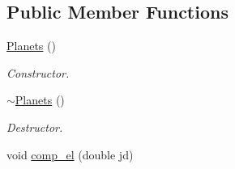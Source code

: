 \subsection*{Public Member Functions}
\begin{DoxyCompactItemize}
\item 
\hypertarget{class_planets_ad8993cde6df4be7c538b95f543f10baf}{\hyperlink{class_planets_ad8993cde6df4be7c538b95f543f10baf}{Planets} ()}\label{class_planets_ad8993cde6df4be7c538b95f543f10baf}

\begin{DoxyCompactList}\small\item\em Constructor. \end{DoxyCompactList}\item 
\hypertarget{class_planets_acc22f0f7e028a47458df1651b9439dce}{\hyperlink{class_planets_acc22f0f7e028a47458df1651b9439dce}{$\sim$\-Planets} ()}\label{class_planets_acc22f0f7e028a47458df1651b9439dce}

\begin{DoxyCompactList}\small\item\em Destructor. \end{DoxyCompactList}\item 
\hypertarget{class_planets_a9cd1fa6bce61f7c26ab039178b721466}{void \hyperlink{class_planets_a9cd1fa6bce61f7c26ab039178b721466}{comp\-\_\-el} (double jd)}\label{class_planets_a9cd1fa6bce61f7c26ab039178b721466}


\end{DoxyCompactItemize}
